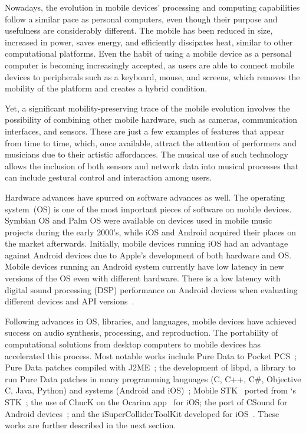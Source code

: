 Nowadays, the evolution in mobile devices' processing and computing capabilities follow a similar pace as personal computers, even though their purpose and usefulness are considerably different.
The mobile has been reduced in size, increased in power, saves energy, and efficiently dissipates heat, similar to other computational platforms.
Even the habit of using a mobile device as a personal computer is becoming increasingly accepted, as users are able to connect mobile devices to peripherals such as a keyboard, mouse, and screens, which removes the mobility of the platform and creates a hybrid condition.

Yet, a significant mobility-preserving trace of the mobile evolution involves the possibility of combining other mobile hardware, such as cameras, communication interfaces, and sensors. 
These are just a few examples of features that appear from time to time, which, once available, attract the attention of performers and musicians due to their artistic affordances. 
The musical use of such technology allows the inclusion of both sensors and network data into musical processes that can include gestural control and interaction among users.

Hardware advances have spurred on software advances as well.
The operating system~(OS) is one of the most important pieces of software on mobile devices.
Symbian OS and Palm OS were available on devices used in mobile music projects during the early 2000's, while iOS and Android acquired their places on the market afterwards.
Initially, mobile devices running iOS had an advantage against Android devices due to Apple's development of both hardware and OS.
Mobile devices running an Android system currently have low latency in new versions of the OS even with different hardware.
There is a low latency with digital sound processing (DSP) performance on Android devices when evaluating different devices and API versions~\citep{Bianchi2012ontheperformance}.

Following advances in OS, libraries, and languages, mobile devices have achieved success on audio synthesis, processing, and reproduction.
The portability of computational solutions from desktop computers to mobile devices has accelerated this process.
Most notable works include Pure Data to Pocket PCS~\citep{Geiger2003pda}; Pure Data patches compiled with J2ME~\citep{Schiemer2005pocketgamelan}; the development of libpd, a library to run Pure Data patches in many programming languages (C, C++, C\#, Objective C, Java, Python) and systems (Android and iOS)~\citep{Brinkmann2011embeddingpd}; Mobile STK~\citep{Essl2006mobilestk} ported from \citeauthor{Cook1999stk}`s STK~\citep{Cook1999stk}; the use of ChucK on the Ocarina app~\citep{Wang2008domobilephones} for iOS; the port of CSound for Android devices~\citep{Yi2012csound}; and the iSuperColliderToolKit developed for iOS~\citep{Ito2015isupercolliderkit}.
These works are further described in the next section.

